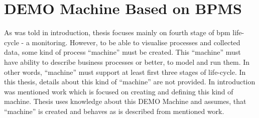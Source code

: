 
\section{DEMO Machine Based on BPMS}
As was told in introduction, thesis focuses mainly on fourth stage of \gls{bpm} life-cycle - a monitoring. However, to be able to visualise processes and collected data, some kind of process ``machine'' must be created. This ``machine'' must have ability to describe business processes or better, to model and run them. In other words, ``machine'' must support at least first three stages of life-cycle. In this thesis, details about this kind of ``machine'' are not provided. In introduction was mentioned work\cite{diploma-skotnica-2016} which is focused on creating and defining this kind of machine. Thesis uses knowledge about this DEMO Machine and assumes, that ``machine'' is created and behaves as is described from mentioned work.

